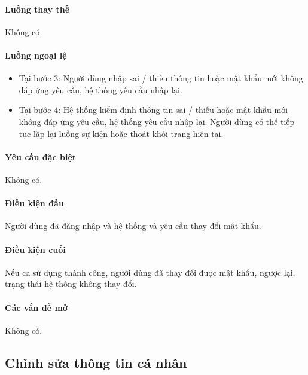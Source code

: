 \documentclass[./../main.tex]{subfiles}
\begin{document}
\paragraph*{Luồng thay thế} Không có

\paragraph*{Luồng ngoại lệ}

\begin{itemize}
\item
  
  Tại bước 3: Người dùng nhập sai / thiếu thông tin hoặc mật khẩu mới
  không đáp ứng yêu cầu, hệ thống yêu cầu nhập lại.
  
\item
  
  Tại bước 4: Hệ thống kiểm định thông tin sai / thiếu hoặc mật khẩu mới
  không đáp ứng yêu cầu, hệ thống yêu cầu nhập lại. Người dùng có thể
  tiếp tục lặp lại luồng sự kiện hoặc thoát khỏi trang hiện tại.
  
\end{itemize}

\paragraph*{Yêu cầu đặc biệt}

Không có.

\paragraph*{Điều kiện đầu}

Người dùng đã đăng nhập và hệ thống và yêu cầu thay đổi mật khẩu.

\paragraph*{Điều kiện cuối}

Nếu ca sử dụng thành công, người dùng đã thay đổi được mật khẩu, ngược
lại, trạng thái hệ thống không thay đổi.

\paragraph*{Các vấn đề mở}

Không có.

\subsection{Chỉnh sửa thông tin cá nhân}
\end{document}
